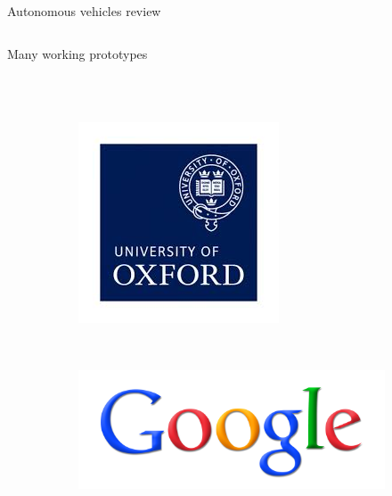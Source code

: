 \begin{frame}{Autonomous vehicles review}
\begin{columns}[T]
\begin{center}
\begin{overlayarea}{\textwidth}{\textheight}
{\begin{block}{Many working prototypes}
\begin{figure}[t]
\begin{subfigure}[b]{0.2\textwidth}
	      \end{subfigure}
	      \\~\\
	      \begin{subfigure}[b]{0.2\textwidth}
		\includegraphics[width=\textwidth]{oxforduni_logo}
	      \end{subfigure}
	      ~
	      \begin{subfigure}[b]{0.2\textwidth}
		\includegraphics[width=\textwidth]{google}
	      \end{subfigure}
	    \end{figure}
	  \end{block}
	  }
	\end{overlayarea}
      \end{center}
    \end{columns}
    

\end{frame}
